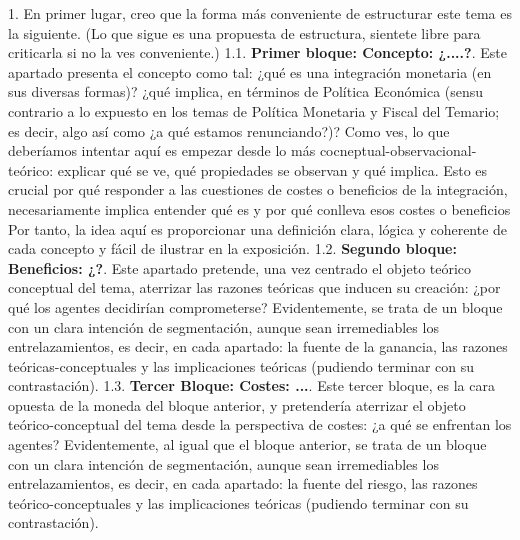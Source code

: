\documentclass[10pt,a4paper]{article}
\begin{document}
{{    1. En primer lugar, creo que la forma más conveniente de estructurar este tema es la siguiente. (Lo que sigue es una propuesta de estructura, sientete libre para criticarla si no la ves conveniente.)
    1.1. \textbf{Primer bloque: Concepto: ¿....?}. Este apartado presenta el concepto como tal: ¿qué es una integración monetaria (en sus diversas formas)? ¿qué implica, en términos de Política Económica (sensu contrario a lo expuesto en los temas de Política Monetaria y Fiscal del Temario; es decir, algo así como ¿a qué estamos renunciando?)? Como ves, lo que deberíamos intentar aquí es empezar desde lo más cocneptual-observacional-teórico: explicar qué se ve, qué propiedades se observan y qué implica. Esto es crucial por qué responder a las cuestiones de costes o beneficios de la integración, necesariamente implica entender qué es y por qué conlleva esos costes o beneficios
    Por tanto, la idea aquí es proporcionar una definición clara, lógica y coherente de cada concepto y fácil de ilustrar en la exposición. 
    1.2. \textbf{Segundo bloque: Beneficios: ¿?}. Este apartado pretende, una vez centrado el objeto teórico conceptual del tema, aterrizar las razones teóricas que inducen su creación: ¿por qué los agentes decidirían comprometerse? Evidentemente, se trata de un bloque con un clara intención de segmentación, aunque sean irremediables los entrelazamientos, es decir, en cada apartado: la fuente de la ganancia, las razones teóricas-conceptuales y las implicaciones teóricas (pudiendo terminar con su contrastación). 
    1.3. \textbf{Tercer Bloque: Costes: ...}. Este tercer bloque, es la cara opuesta de la moneda del bloque anterior, y pretendería aterrizar el objeto teórico-conceptual del tema desde la perspectiva de costes: ¿a qué se enfrentan los agentes? Evidentemente, al igual que el bloque anterior, se trata de un bloque con un clara intención de segmentación, aunque sean irremediables los entrelazamientos, es decir, en cada apartado: la fuente del riesgo, las razones teórico-conceptuales y las implicaciones teóricas (pudiendo terminar con su contrastación). 
    
}}
\end{document}
